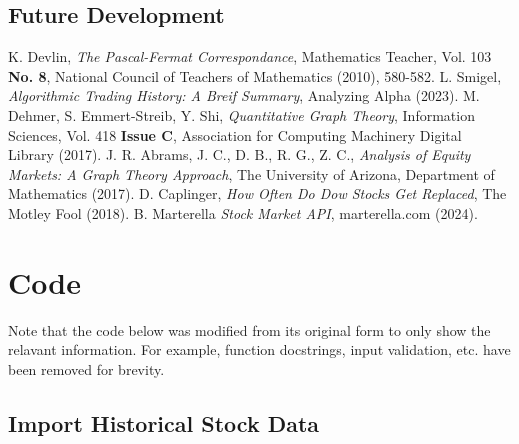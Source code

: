 \documentclass{article}
\begin{document}
\subsection{Future Development}



\begin{thebibliography}{99}
    K. Devlin, \emph{The Pascal-Fermat Correspondance}, Mathematics Teacher, Vol. 103 \textbf{No. 8}, National Council of Teachers of Mathematics (2010), 580-582.
    L. Smigel, \emph{Algorithmic Trading History: A Breif Summary}, Analyzing Alpha (2023).
    M. Dehmer, S. Emmert-Streib, Y. Shi, \emph{Quantitative Graph Theory}, Information Sciences, Vol. 418 \textbf{Issue C}, Association for Computing Machinery Digital Library (2017).
    J. R. Abrams, J. C., D. B., R. G., Z. C., \emph{Analysis of Equity Markets: A Graph Theory Approach}, The University of Arizona, Department of Mathematics (2017).
    D. Caplinger, \emph{How Often Do Dow Stocks Get Replaced}, The Motley Fool (2018).
    B. Marterella \emph{Stock Market API}, marterella.com (2024).
\end{thebibliography}

\clearpage

\appendix

\section{Code}
Note that the code below was modified from its original form to only show the relavant information. For example, function docstrings, input validation, etc. have been removed for brevity.

\subsection{Import Historical Stock Data}
\end{document}

